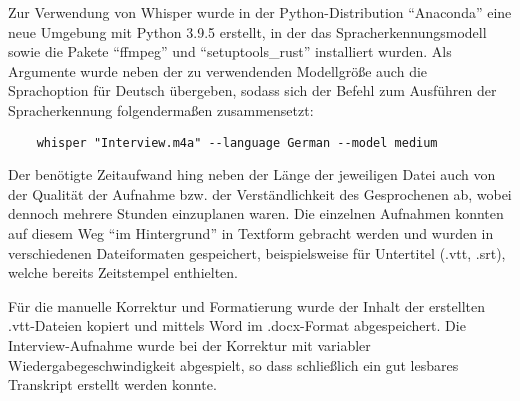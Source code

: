 Zur Verwendung von Whisper wurde in der Python-Distribution \enquote{Anaconda} eine neue Umgebung mit Python 3.9.5 erstellt, in der das Spracherkennungsmodell sowie die Pakete \enquote{ffmpeg} und \enquote{setuptools\_rust} installiert wurden. Als Argumente wurde neben der zu verwendenden Modellgröße auch die Sprachoption für Deutsch übergeben, sodass sich der Befehl zum Ausführen der Spracherkennung folgendermaßen zusammensetzt:

\begin{verbatim}
	whisper "Interview.m4a" --language German --model medium
\end{verbatim}

Der benötigte Zeitaufwand hing neben der Länge der jeweiligen Datei auch von der Qualität der Aufnahme bzw. der Verständlichkeit des Gesprochenen ab, wobei dennoch mehrere Stunden einzuplanen waren. Die einzelnen Aufnahmen konnten auf diesem Weg \enquote{im Hintergrund} in Textform gebracht werden und wurden in verschiedenen Dateiformaten gespeichert, beispielsweise für Untertitel (.vtt, .srt), welche bereits Zeitstempel enthielten.

Für die manuelle Korrektur und Formatierung wurde der Inhalt der erstellten .vtt-Dateien kopiert und mittels Word im .docx-Format abgespeichert. Die Interview-Aufnahme wurde bei der Korrektur mit variabler Wiedergabegeschwindigkeit abgespielt, so dass schließlich ein gut lesbares Transkript erstellt werden konnte.